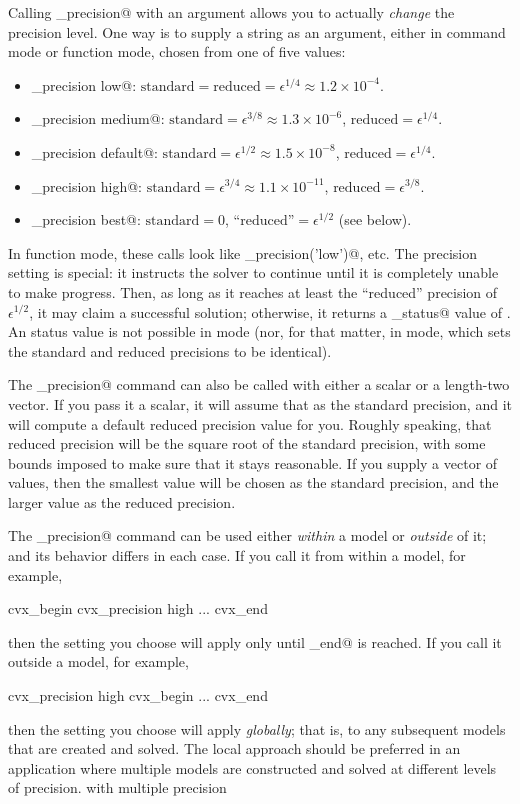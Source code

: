 \documentclass[12pt]{article}
\begin{document}
Calling \verb@cvx_precision@ with an argument allows you to actually \emph{change} the
precision level. One way is to supply a string as an argument, either in command mode
or function mode, chosen from one of five values:
\begin{itemize}
	\item \verb@cvx_precision low@:      $\text{standard} = \text{reduced} = \epsilon^{1/4} \approx 1.2\times10^{-4}$.
	\item \verb@cvx_precision medium@:   $\text{standard} = \epsilon^{3/8} \approx 1.3\times10^{-6}$, $\text{reduced} = \epsilon^{1/4}$.
	\item \verb@cvx_precision default@:  $\text{standard} = \epsilon^{1/2} \approx 1.5\times10^{-8}$, $\text{reduced} = \epsilon^{1/4}$.
	\item \verb@cvx_precision high@:     $\text{standard} = \epsilon^{3/4} \approx 1.1\times10^{-11}$, $\text{reduced} = \epsilon^{3/8}$.
	\item \verb@cvx_precision best@:     $\text{standard} = 0$, $\text{``reduced''} = \epsilon^{1/2}$  (see below).
\end{itemize}
In function mode, these calls look like \verb@cvx_precision('low')@, etc.
The \verb@best@ precision setting is special: it instructs the solver to continue until it is
completely unable to make progress. Then, as long as it reaches at least the ``reduced'' precision
of $\epsilon^{1/2}$, it may claim a successful solution; otherwise,
it returns a \verb@cvx_status@ value of \verb@Failed@. An \verb@Inaccurate@ status value is 
not possible in \verb@best@ mode (nor, for that matter, in \verb@low@ mode, which
sets the standard and reduced precisions to be identical).

The \verb@cvx_precision@ command can also be called with either a scalar or a
length-two vector. If you pass it a scalar, it will assume that as the standard
precision, and it will compute a default reduced precision value for you.
Roughly speaking, that reduced precision will be the square root of the standard
precision, with some bounds imposed to make sure that it stays reasonable. If
you supply a vector of values, then the smallest value will be chosen as
the standard precision, and the larger value as the reduced precision.

The \verb@cvx_precision@ command can be used either \emph{within} a \cvx model or
\emph{outside} of it; and its behavior differs in each case. If you call it from
within a model, for example,
\begin{code}
	cvx_begin
	    cvx_precision high
	    ...
	cvx_end
\end{code}
then the setting you choose will apply only until \verb@cvx_end@ is reached. If you call it outside
a model, for example,
\begin{code}
	cvx_precision high
	cvx_begin
	    ...
	cvx_end
\end{code}
then the setting you choose will apply \emph{globally}; that is, to any
subsequent models that are created and solved. The local approach should be
preferred in an application where multiple models are constructed and solved
at different levels of precision.
with multiple precision
\end{document}
